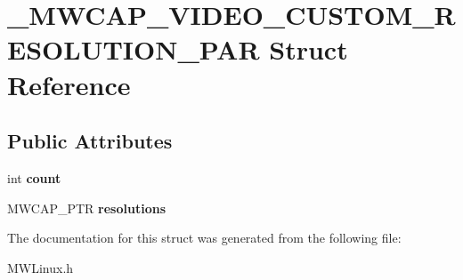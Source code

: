 \hypertarget{struct__MWCAP__VIDEO__CUSTOM__RESOLUTION__PAR}{\section{\-\_\-\-M\-W\-C\-A\-P\-\_\-\-V\-I\-D\-E\-O\-\_\-\-C\-U\-S\-T\-O\-M\-\_\-\-R\-E\-S\-O\-L\-U\-T\-I\-O\-N\-\_\-\-P\-A\-R Struct Reference}
\label{struct__MWCAP__VIDEO__CUSTOM__RESOLUTION__PAR}
}
\subsection*{Public Attributes}
\begin{DoxyCompactItemize}
\item 
\hypertarget{struct__MWCAP__VIDEO__CUSTOM__RESOLUTION__PAR_a00725b5fe905dd8a3245137224a8698c}{int {\bfseries count}}\label{struct__MWCAP__VIDEO__CUSTOM__RESOLUTION__PAR_a00725b5fe905dd8a3245137224a8698c}

\item 
\hypertarget{struct__MWCAP__VIDEO__CUSTOM__RESOLUTION__PAR_a6ba00b4ca1356bb09ef6dba4344fc13c}{M\-W\-C\-A\-P\-\_\-\-P\-T\-R {\bfseries resolutions}}\label{struct__MWCAP__VIDEO__CUSTOM__RESOLUTION__PAR_a6ba00b4ca1356bb09ef6dba4344fc13c}

\end{DoxyCompactItemize}


The documentation for this struct was generated from the following file\-:\begin{DoxyCompactItemize}
\item 
M\-W\-Linux.\-h\end{DoxyCompactItemize}
